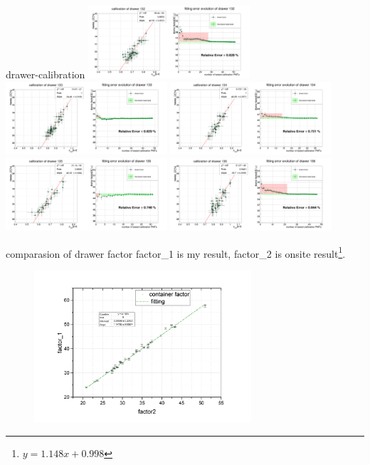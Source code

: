 \documentclass[11pt,compress,xcolor=x11names,UTF8]{beamer}
\begin{document}
\begin{frame}{drawer-calibration}
\vspace{-.5cm}
\includegraphics[width=0.45\textwidth]{sta101-30} 
\includegraphics[width=0.45\textwidth]{sta101-31} 
\includegraphics[width=0.45\textwidth]{sta101-32} 
\includegraphics[width=0.45\textwidth]{sta101-33} 
\includegraphics[width=0.45\textwidth]{sta101-34} 
\end{frame}
\begin{frame}{comparasion of drawer factor}
factor\_1 is my result, factor\_2 is onsite result\footnote{$y=1.148x+0.998$}.
\vspace{-.05cm}
\begin{figure}
\includegraphics[width=0.72\textwidth]{drawerfactors} 
\end{figure}
\end{frame}
\end{document}
